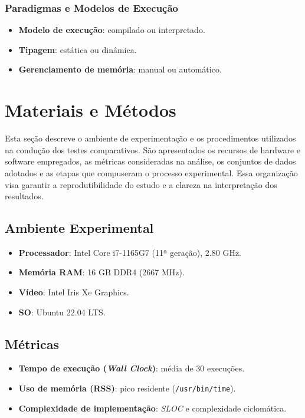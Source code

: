 \documentclass[12pt,a4paper]{article}
\newcommand{\eng}[1]{\textit{#1}}
\begin{document}
\subsubsection{Paradigmas e Modelos de Execução}
\begin{itemize}
  \item \textbf{Modelo de execução}: compilado ou interpretado.
  \item \textbf{Tipagem}: estática ou dinâmica.
  \item \textbf{Gerenciamento de memória}: manual ou automático.
\end{itemize}




\section{Materiais e Métodos}

Esta seção descreve o ambiente de experimentação e os procedimentos utilizados na condução dos testes comparativos. São apresentados os recursos de hardware e software empregados, as métricas consideradas na análise, os conjuntos de dados adotados e as etapas que compuseram o processo experimental. Essa organização visa garantir a reprodutibilidade do estudo e a clareza na interpretação dos resultados.

\subsection{Ambiente Experimental}
\begin{itemize}
  \item \textbf{Processador}: Intel Core i7-1165G7 (11ª geração), 2.80 GHz.
  \item \textbf{Memória RAM}: 16 GB DDR4 (2667 MHz).
  \item \textbf{Vídeo}: Intel Iris Xe Graphics.
  \item \textbf{SO}: Ubuntu 22.04 LTS.
\end{itemize}

\subsection{Métricas}
\begin{itemize}
  \item \textbf{Tempo de execução (\eng{Wall Clock})}: média de 30 execuções.
  \item \textbf{Uso de memória (RSS)}: pico residente (\texttt{/usr/bin/time}).
  \item \textbf{Complexidade de implementação}: \eng{SLOC} e complexidade ciclomática.
\end{itemize}
\end{document}
